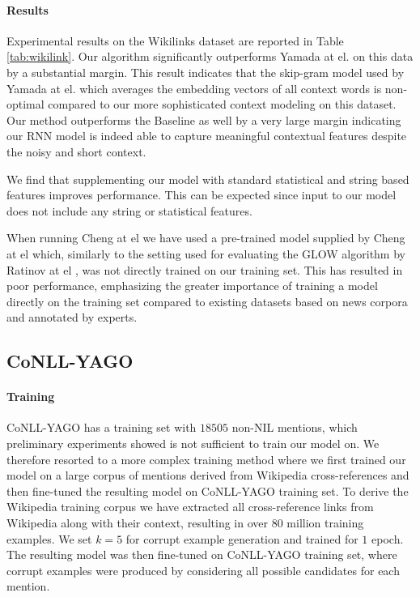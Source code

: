 \documentclass[11pt]{article}
\begin{document}
\paragraph{Results}
Experimental results on the Wikilinks dataset are reported in Table \ref{tab:wikilink}. Our algorithm significantly outperforms Yamada at el. on this data by a substantial margin. This result indicates that the skip-gram model used by Yamada at el. which averages the embedding vectors of all context words is non-optimal compared to our more sophisticated context modeling on this dataset. Our method outperforms the Baseline as well by a very large margin indicating our RNN model is indeed able to capture meaningful contextual features despite the noisy and short context. 

We find that supplementing our model with standard statistical and string based features improves performance. This can be expected since input to our model does not include any string or statistical features. 

When running Cheng at el  we have used a pre-trained model supplied by Cheng at el which, similarly to the setting used for evaluating the GLOW algorithm by Ratinov at el \cite{ratinov2011glow}, was not directly trained on our training set. This has resulted in poor performance, emphasizing the greater importance of training a model directly on the training set compared to existing datasets based on news corpora and annotated by experts.

\subsection{CoNLL-YAGO}

\paragraph{Training}
CoNLL-YAGO has a training set with $18505$ non-NIL mentions, which preliminary experiments showed is not sufficient to train our model on. We therefore resorted to a more complex training method where we first trained our model on a large corpus of mentions derived from Wikipedia cross-references and then fine-tuned the resulting model on CoNLL-YAGO training set. To derive the Wikipedia training corpus we have extracted all cross-reference links from Wikipedia along with their context, resulting in over $80$ million training examples. We set $k=5$ for corrupt example generation and trained for $1$ epoch. The resulting model was then fine-tuned on CoNLL-YAGO training set, where corrupt examples were produced by considering all possible candidates for each mention.
\end{document}

